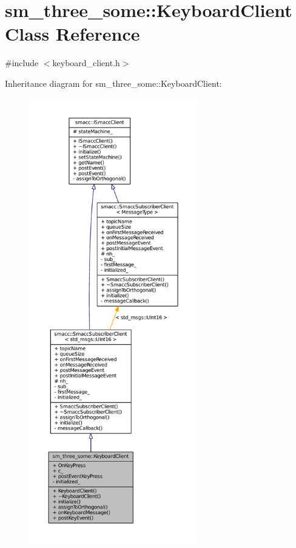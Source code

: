 \hypertarget{classsm__three__some_1_1KeyboardClient}{}\section{sm\+\_\+three\+\_\+some\+:\+:Keyboard\+Client Class Reference}
\label{classsm__three__some_1_1KeyboardClient}


{\ttfamily \#include $<$keyboard\+\_\+client.\+h$>$}



Inheritance diagram for sm\+\_\+three\+\_\+some\+:\+:Keyboard\+Client\+:
\nopagebreak
\begin{figure}[H]
\begin{center}
\leavevmode
\includegraphics[height=550pt]{classsm__three__some_1_1KeyboardClient__inherit__graph}
\end{center}
\end{figure}


